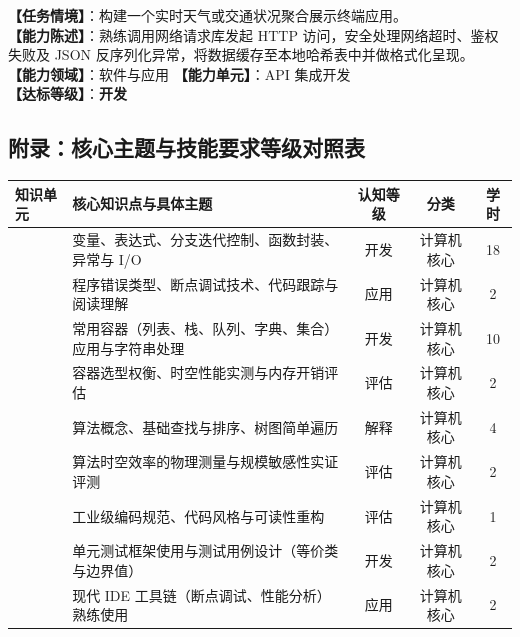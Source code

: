 \begin{taskbox}
\textbf{【任务情境】}：构建一个实时天气或交通状况聚合展示终端应用。\\
\textbf{【能力陈述】}：熟练调用网络请求库发起 HTTP 访问，安全处理网络超时、鉴权失败及 JSON 反序列化异常，将数据缓存至本地哈希表中并做格式化呈现。\\
\textbf{【能力领域】}：软件与应用 \quad \textbf{【能力单元】}：API 集成开发\\
\textbf{【达标等级】}：\textbf{开发}
\end{taskbox}

\begin{strip}
\section{附录：核心主题与技能要求等级对照表}

\noindent\begin{tabularx}{\textwidth}{p{} Y c c c}
\toprule
\textbf{知识单元} & \textbf{核心知识点与具体主题} & \textbf{认知等级} & \textbf{分类} & \textbf{学时} \\
\midrule
{} 
& 变量、表达式、分支迭代控制、函数封装、异常与 I/O & 开发 & 计算机核心 & 18 \\
& 程序错误类型、断点调试技术、代码跟踪与阅读理解 & 应用 & 计算机核心 & 2 \\
\midrule
{} 
& 常用容器（列表、栈、队列、字典、集合）应用与字符串处理 & 开发 & 计算机核心 & 10 \\
& 容器选型权衡、时空性能实测与内存开销评估 & 评估 & 计算机核心 & 2 \\
\midrule
{} 
& 算法概念、基础查找与排序、树图简单遍历 & 解释 & 计算机核心 & 4 \\
& 算法时空效率的物理测量与规模敏感性实证评测 & 评估 & 计算机核心 & 2 \\
\midrule
{} 
& 工业级编码规范、代码风格与可读性重构 & 评估 & 计算机核心 & 1 \\
& 单元测试框架使用与测试用例设计（等价类与边界值） & 开发 & 计算机核心 & 2 \\
& 现代 IDE 工具链（断点调试、性能分析）熟练使用 & 应用 & 计算机核心 & 2 \\
\bottomrule
\end{tabularx}
\end{strip}
